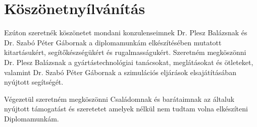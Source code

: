 \chapter*{Köszönetnyílvánítás}

Ezúton szeretnék köszönetet mondani konzulenseimnek Dr. Plesz Balázsnak és Dr. Szabó Péter Gábornak a diplomamunkám elkészítésében mutatott kitartásukért, segítőkészségükért és rugalmasságukért. Szeretném megköszönni Dr. Plesz Balázsnak a gyártástechnológiai tanácsokat, meglátásokat és ötleteket, valamint Dr. Szabó Péter Gábornak a szimulációs eljárások elsajátításában nyújtott segítségét.

Végezetül szeretném megköszönni Családomnak és barátaimnak az általuk nyújtott támogatást és szeretetet amelyek nélkül nem tudtam volna elkészíteni Diplomamunkám.
